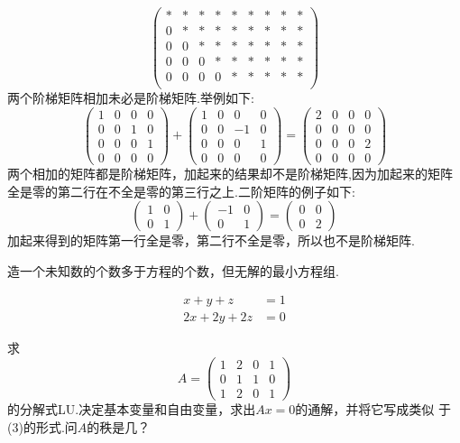 ﻿\documentclass{book} \usepackage{exsheets} \usepackage{xeCJK}
\begin{document}
\begin{solution}
  $$ 
  \begin{pmatrix}
    *&*&*&*&*&*&*&*&*\\
    0&*&*&*&*&*&*&*&*\\
    0&0&*&*&*&*&*&*&*\\
    0&0&0&*&*&*&*&*&*\\
    0&0&0&0&*&*&*&*&*\\
  \end{pmatrix}
 $$
 两个阶梯矩阵相加未必是阶梯矩阵.举例如下:
$$
\begin{pmatrix}
  1&0&0&0\\
  0&0&1&0\\
  0&0&0&1\\
  0&0&0&0
\end{pmatrix}+
\begin{pmatrix}
  1&0&0&0\\
  0&0&-1&0\\
  0&0&0&1\\
  0&0&0&0
\end{pmatrix}=
\begin{pmatrix}
  2&0&0&0\\
  0&0&0&0\\
  0&0&0&2\\
  0&0&0&0
\end{pmatrix}
$$
两个相加的矩阵都是阶梯矩阵，加起来的结果却不是阶梯矩阵,因为加起来的矩阵
全是零的第二行在不全是零的第三行之上.二阶矩阵的例子如下:
$$
\begin{pmatrix}
  1&0\\
  0&1
\end{pmatrix}+
\begin{pmatrix}
  -1&0\\
  0&1
\end{pmatrix}=
\begin{pmatrix}
  0&0\\
  0&2
\end{pmatrix}
$$
加起来得到的矩阵第一行全是零，第二行不全是零，所以也不是阶梯矩阵.
\end{solution}
\begin{question}
  造一个未知数的个数多于方程的个数，但无解的最小方程组.
\end{question}
\begin{solution}
  \begin{align*}
    x+y+z&=1\\
    2x+2y+2z&=0
  \end{align*}
\end{solution}
\begin{question}
  求
$$
A=
\begin{pmatrix}
  1&2&0&1\\
  0&1&1&0\\
  1&2&0&1
\end{pmatrix}
$$
的分解式LU.决定基本变量和自由变量，求出$Ax=0$的通解，并将它写成类似
于(3)的形式.问$A$的秩是几？
\end{question}
\end{document}
